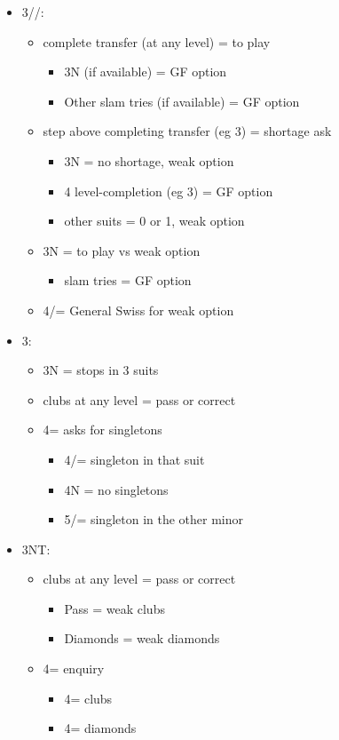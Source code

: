 \documentclass[a4paper,14pt]{extarticle}
\begin{document}
\begin{itemize}
\item 3\clubs/\diamonds/\hearts:
	\begin{itemize}
	\item complete transfer (at any level) = to play
		\begin{itemize}
		\item 3N (if available) = GF option
		\item Other slam tries (if available) = GF option
		\end{itemize}
	\item step above completing transfer (eg 3\hearts) = shortage ask
		\begin{itemize}
		\item 3N = no shortage, weak option
		\item 4 level-completion (eg 3\diamonds) = GF option
		\item other suits = 0 or 1, weak option
		\end{itemize}
	\item 3N = to play vs weak option
		\begin{itemize}
		\item slam tries = GF option
		\end{itemize}
	\item 4\clubs/\diamonds = General Swiss for weak option~
	\end{itemize}

\item 3\spades:
	\begin{itemize}
	\item 3N = stops in 3 suits
	\item clubs at any level = pass or correct
	\item 4\diamonds = asks for singletons
		\begin{itemize}
		\item 4\hearts/\spades = singleton in that suit
		\item 4N = no singletons
		\item 5\clubs/\diamonds = singleton in the other minor
		\end{itemize}
	\end{itemize}

\item 3NT:
	\begin{itemize}
	\item clubs at any level = pass or correct
		\begin{itemize}
		\item Pass = weak clubs
		\item Diamonds = weak diamonds
		\end{itemize}
	\item 4\diamonds = enquiry
		\begin{itemize}
		\item 4\hearts = clubs
		\item 4\spades = diamonds
		\end{itemize}
	\end{itemize}


\end{itemize}
\end{document}
